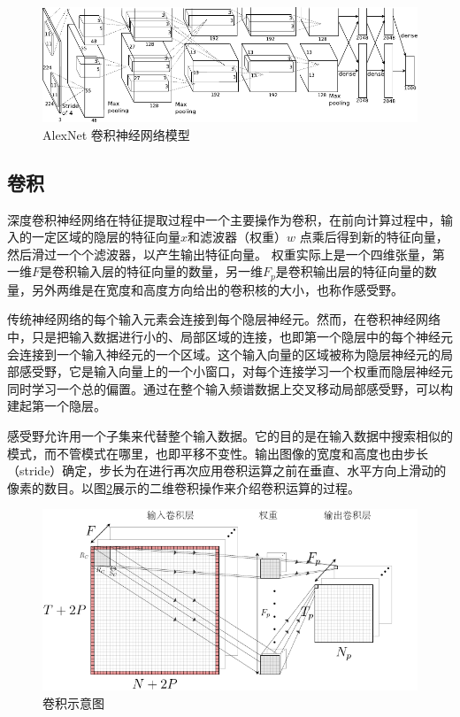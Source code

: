 \begin{figure}[hbt]
  \centering
  \includegraphics[width=13.5cm]{figures/networks/alexnetarchitecture}
  \caption{ AlexNet 卷积神经网络模型}
  \label{fig:cnn_network}
\end{figure}

\subsection{卷积}

深度卷积神经网络在特征提取过程中一个主要操作为卷积，在前向计算过程中，输入的一定区域的隐层的特征向量$x$和滤波器（权重）$w$ 点乘后得到新的特征向量，然后滑过一个个滤波器，以产生输出特征向量。
权重实际上是一个四维张量，第一维$ F $是卷积输入层的特征向量的数量，另一维$ F_p $是卷积输出层的特征向量的数量，另外两维是在宽度和高度方向给出的卷积核的大小，也称作感受野。

传统神经网络的每个输入元素会连接到每个隐层神经元。然而，在卷积神经网络中，只是把输入数据进行小的、局部区域的连接，也即第一个隐层中的每个神经元会连接到一个输入神经元的一个区域。这个输入向量的区域被称为隐层神经元的局部感受野，它是输入向量上的一个小窗口，对每个连接学习一个权重而隐层神经元同时学习一个总的偏置。通过在整个输入频谱数据上交叉移动局部感受野，可以构建起第一个隐层。

感受野允许用一个子集来代替整个输入数据。它的目的是在输入数据中搜索相似的模式，而不管模式在哪里，也即平移不变性。输出图像的宽度和高度也由步长（stride）确定，步长为在进行再次应用卷积运算之前在垂直、水平方向上滑动的像素的数目。以图\ref{fig:conv}展示的二维卷积操作来介绍卷积运算的过程。

\begin{figure}[hbt]
	\centering
  \includegraphics[width=13.5cm]{figures/networks/conv}
	\caption{卷积示意图}
	\label{fig:conv}
\end{figure}

